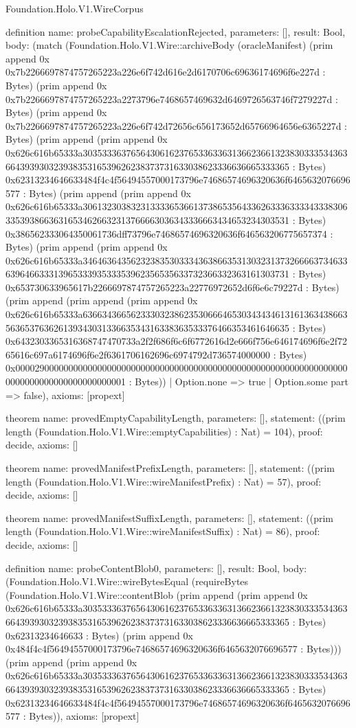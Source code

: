 \begin{lexlean}{Foundation.Holo.V1.WireCorpus}
\begin{semanticmodule}
definition{
  name: probeCapabilityEscalationRejected,
  parameters: [],
  result: Bool,
  body: (match (Foundation.Holo.V1.Wire::archiveBody (oracleManifest) (prim append 0x 0x7b2266697874757265223a226e6f742d616e2d6170706c69636174696f6e227d : Bytes) (prim append 0x 0x7b2266697874757265223a2273796e7468657469632d6469726563746f7279227d : Bytes) (prim append 0x 0x7b2266697874757265223a226e6f742d72656c656173652d65766964656e6365227d : Bytes) (prim append (prim append 0x 0x626c616b65333a303533363765643061623765336336313662366132383033353436366439393032393835316539626238373731633038623336636665333365 : Bytes) 0x62313234646633484f4c4f56494557000173796e74686574696320636f6465632076696577 : Bytes) (prim append (prim append 0x 0x626c616b65333a306132303832313333653661373865356433626333633334333830633539386636316534626632313766663036343336663434653234303531 : Bytes) 0x386562333064350061736dff73796e74686574696320636f646563206775657374 : Bytes) (prim append (prim append 0x 0x626c616b65333a346463643562323835303334363866353130323137326666373463363964663331396533393533353962356535633732366332363161303731 : Bytes) 0x653730633965617b2266697874757265223a22776972652d6f6e6c79227d : Bytes) (prim append (prim append (prim append 0x 0x626c616b65333a636634366562333032386235306664653034343461316136343866356365376362613934303133663534316338363533376466353461646635 : Bytes) 0x6432303365316368747470733a2f2f686f6c6f6772616d2e666f756e646174696f6e2f7265616c697a6174696f6e2f6361706162696c6974792d736574000000 : Bytes) 0x0000290000000000000000000000000000000000000000000000000000000000000000000000000000000000000001 : Bytes))
    | Option.none => true
    | Option.some part => false),
  axioms: [propext]
}

theorem{
  name: provedEmptyCapabilityLength,
  parameters: [],
  statement: ((prim length (Foundation.Holo.V1.Wire::emptyCapabilities) : Nat) = 104),
  proof: decide{},
  axioms: []
}

theorem{
  name: provedManifestPrefixLength,
  parameters: [],
  statement: ((prim length (Foundation.Holo.V1.Wire::wireManifestPrefix) : Nat) = 57),
  proof: decide{},
  axioms: []
}

theorem{
  name: provedManifestSuffixLength,
  parameters: [],
  statement: ((prim length (Foundation.Holo.V1.Wire::wireManifestSuffix) : Nat) = 86),
  proof: decide{},
  axioms: []
}

definition{
  name: probeContentBlob0,
  parameters: [],
  result: Bool,
  body: (Foundation.Holo.V1.Wire::wireBytesEqual (requireBytes (Foundation.Holo.V1.Wire::contentBlob (prim append (prim append 0x 0x626c616b65333a303533363765643061623765336336313662366132383033353436366439393032393835316539626238373731633038623336636665333365 : Bytes) 0x62313234646633 : Bytes) (prim append 0x 0x484f4c4f56494557000173796e74686574696320636f6465632076696577 : Bytes))) (prim append (prim append 0x 0x626c616b65333a303533363765643061623765336336313662366132383033353436366439393032393835316539626238373731633038623336636665333365 : Bytes) 0x62313234646633484f4c4f56494557000173796e74686574696320636f6465632076696577 : Bytes)),
  axioms: [propext]
}


\end{semanticmodule}
\end{lexlean}
